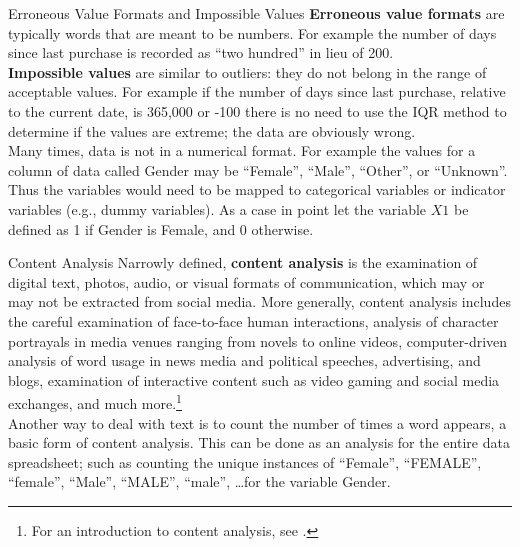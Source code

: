 \documentclass[pdf]{beamer}
\newcommand{\empr}[1]{{\color{franklinblue}\textbf{#1}}}
\theoremstyle{remark}
\theoremstyle{definition}
\begin{document}
\begin{frame}[t]{Erroneous Value Formats and Impossible Values}
\empr{Erroneous value formats} are typically words that are meant to be numbers. For example the number of days since last purchase is recorded as ``two hundred'' in lieu of 200. \\
\vspace{1.5ex} 
 \empr{Impossible values} are similar to outliers: they do not belong in the range of acceptable values. For example if the number of days since last purchase, relative to the current date, is 365,000 or -100 there is no need to use the IQR method to determine if the values are extreme; the data are obviously wrong.\\
\vspace{1.5ex}
Many times, data is not in a numerical format. For example the values for a column of data called Gender may be ``Female'', ``Male'', ``Other'', or ``Unknown''. Thus the variables would need to be mapped to categorical variables or indicator variables (e.g., dummy variables).  As a case in point let the variable $X1$ be defined as 1 if Gender is Female, and 0 otherwise.
\end{frame}

\begin{frame}[t]{Content Analysis}
Narrowly defined, \empr{content analysis} is the examination of digital text, photos, audio, or visual formats of communication, which may or may not be extracted from social media. More generally, content analysis includes the careful examination of face-to-face human interactions, analysis of character portrayals in media venues ranging from novels to online videos, computer-driven analysis of word usage in news media and political speeches, advertising, and blogs, examination of interactive content such as video gaming and social media exchanges, and much more.\footnote{For an introduction to content analysis, see \cite{krippendorff2019}.} %
 \\
\vspace{1.5ex}
Another way to deal with text is to count the number of times a word appears, a basic form of content analysis. This can be done as an analysis for the entire data spreadsheet; such as counting the unique instances of ``Female'', ``FEMALE'', ``female'', ``Male'', ``MALE'', ``male'', \ldots for the variable Gender.    
\end{frame}
\end{document}
